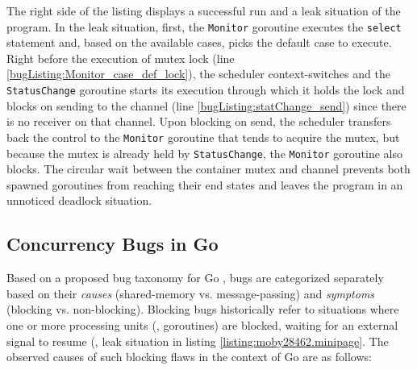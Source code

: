 %
The right side of the listing displays a successful run and a leak situation of the program.
%
In the leak situation, first, the \texttt{Monitor} goroutine executes the \texttt{select} statement and, based on the available cases, picks the default case to execute.
%
Right before the execution of mutex lock (line \ref{bugListing:Monitor_case_def_lock}), the scheduler context-switches and the \texttt{StatusChange} goroutine starts its execution through which it holds the lock and blocks on sending to the channel (line \ref{bugListing:statChange_send}) since there is no receiver on that channel.
%
Upon blocking on send, the scheduler transfers back the control to the \texttt{Monitor} goroutine that tends to acquire the mutex, but because the mutex is already held by \texttt{StatusChange}, the \texttt{Monitor} goroutine also blocks.
%
The circular wait between the container mutex and channel prevents both spawned goroutines from reaching their end states and leaves the program in an unnoticed deadlock situation.
%
%
%
%

\subsection{Concurrency Bugs in Go}
\label{sec:goBugs}
Based on a proposed bug taxonomy for Go \cite{tu-concurrentBugs-asplos19}, bugs are categorized separately based on their \textit{causes} (shared-memory vs. message-passing) and \textit{symptoms} (blocking vs. non-blocking).
%
Blocking bugs historically refer to situations where one or more processing units (\eg, goroutines) are blocked, waiting for an external signal to resume (\eg, leak situation in listing \ref{listing:moby28462.minipage}.
%
The observed causes of such blocking flaws in the context of Go are as follows:

